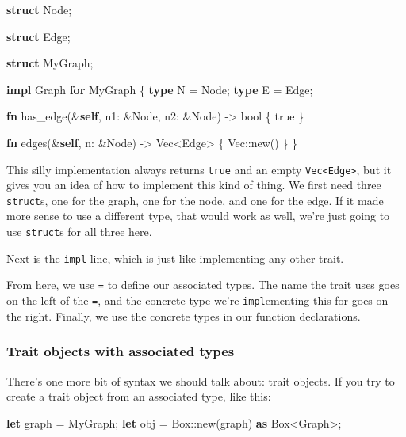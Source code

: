 \documentclass[a4paper,]{book}
\newenvironment{Shaded}{\begin{snugshade}}{\end{snugshade}}
\newcommand{\KeywordTok}[1]{\textcolor[rgb]{0.13,0.29,0.53}{\textbf{{#1}}}}
\newcommand{\DataTypeTok}[1]{\textcolor[rgb]{0.13,0.29,0.53}{{#1}}}
\newcommand{\ConstantTok}[1]{\textcolor[rgb]{0.00,0.00,0.00}{{#1}}}
\newcommand{\NormalTok}[1]{{#1}}
\begin{document}
\begin{Shaded}
\begin{Highlighting}[]
\KeywordTok{struct} \NormalTok{Node;}

\KeywordTok{struct} \NormalTok{Edge;}

\KeywordTok{struct} \NormalTok{MyGraph;}

\KeywordTok{impl} \NormalTok{Graph }\KeywordTok{for} \NormalTok{MyGraph \{}
    \KeywordTok{type} \NormalTok{N = Node;}
    \KeywordTok{type} \NormalTok{E = Edge;}

    \KeywordTok{fn} \NormalTok{has_edge(&}\KeywordTok{self}\NormalTok{, n1: &Node, n2: &Node) -> }\DataTypeTok{bool} \NormalTok{\{}
        \ConstantTok{true}
    \NormalTok{\}}

    \KeywordTok{fn} \NormalTok{edges(&}\KeywordTok{self}\NormalTok{, n: &Node) -> }\DataTypeTok{Vec}\NormalTok{<Edge> \{}
        \DataTypeTok{Vec}\NormalTok{::new()}
    \NormalTok{\}}
\NormalTok{\}}
\end{Highlighting}
\end{Shaded}

This silly implementation always returns \texttt{true} and an empty
\texttt{Vec\textless{}Edge\textgreater{}}, but it gives you an idea of
how to implement this kind of thing. We first need three
\texttt{struct}s, one for the graph, one for the node, and one for the
edge. If it made more sense to use a different type, that would work as
well, we're just going to use \texttt{struct}s for all three here.

Next is the \texttt{impl} line, which is just like implementing any
other trait.

From here, we use \texttt{=} to define our associated types. The name
the trait uses goes on the left of the \texttt{=}, and the concrete type
we're \texttt{impl}ementing this for goes on the right. Finally, we use
the concrete types in our function declarations.

\subsubsection{Trait objects with associated
types}\label{trait-objects-with-associated-types}

There's one more bit of syntax we should talk about: trait objects. If
you try to create a trait object from an associated type, like this:

\begin{Shaded}
\begin{Highlighting}[]
\KeywordTok{let} \NormalTok{graph = MyGraph;}
\KeywordTok{let} \NormalTok{obj = }\DataTypeTok{Box}\NormalTok{::new(graph) }\KeywordTok{as} \DataTypeTok{Box}\NormalTok{<Graph>;}
\end{Highlighting}
\end{Shaded}
\end{document}
